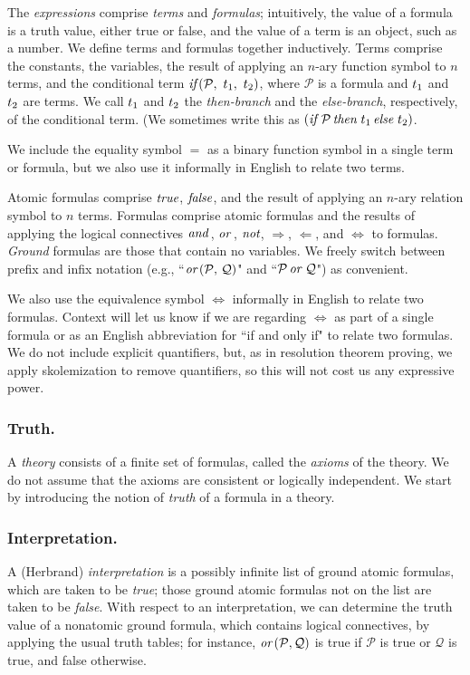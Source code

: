 \documentclass[runningheads]{llncs}
\DeclareMathOperator{\uand}{\emph{and}\,}
\DeclareMathOperator{\uor}{\emph{or}\,}
\DeclareMathOperator{\unot}{\emph{not}\kern-.0pt}
\DeclareMathOperator{\uimplies}{\Rightarrow}
\DeclareMathOperator{\uimpliedby}{\Leftarrow}
\DeclareMathOperator{\uiff}{\iff}
\DeclareMathOperator{\uif}{\emph{if}\,}
\DeclareMathOperator{\uthen}{\emph{then}\,}
\DeclareMathOperator{\uelse}{\emph{else}\,}
\begin{document}
   The \emph{expressions} comprise \emph{terms} and \emph{formulas}; intuitively, the value of a formula is a truth value, either true or false, and the value of a term is an object, such as a number.  We define terms and formulas together inductively.  Terms comprise the constants, the variables, the result of applying an $n$-ary function symbol to $n$ terms, and the conditional term  $\emph{if}\,( {\mathcal{P}},\allowbreak \ {{t}_{1}},\allowbreak \ {{t}_{2}})$, where $\mathcal{P}$ is a formula and  ${t}_{1}$ and ${t}_{2}$ are terms.   We call ${t}_{1}$ and ${t}_{2}$ the \emph{then-branch} and the \emph{else-branch}, respectively, of the conditional term. (We sometimes write this as 
   $(\uif \mathcal{P} \uthen t_1 \uelse t_2)$.
   
   We include the equality symbol $=$ as a binary function symbol in a single term or formula, but we also use it informally in English to relate two terms.
   
   Atomic formulas comprise $\emph{true}$, $\emph{false}$, and the result of applying an $n$-ary relation symbol to $n$ terms. Formulas comprise atomic formulas and the results of applying the logical connectives $\uand$,  $\uor$, $\unot$,  $\uimplies$, $\uimpliedby$, and  $\uiff$ to formulas. \emph{Ground} formulas are those that contain no variables. We freely switch between prefix and infix notation (e.g.,  ``$\uor(\mathcal{P},\, \mathcal{Q})$" and ``$\mathcal{P} \uor \mathcal{Q}$") as convenient.
   
   We also use the equivalence symbol $\uiff$ informally in English to relate two formulas. 
   Context will let us know if we are regarding $\uiff$ as part of a single formula or as an English abbreviation for “if and only if" to relate two formulas.
   We do not include explicit quantifiers, but, as in resolution theorem proving, we apply skolemization to remove quantifiers, so this will not cost us any expressive power. 
   
  
   
  \subsubsection{Truth.}  A \emph{theory} consists of a finite set of formulas, called the \emph{axioms} of the theory. We do not assume that the axioms are consistent or logically independent. We start by introducing the notion of \emph{truth} of a formula in a theory.
   
   \subsubsection{Interpretation.} A (Herbrand) \emph{interpretation} is a possibly infinite list of ground atomic formulas, which are taken to be \emph{true}; those ground atomic formulas not on the list are taken to be \emph{false}.  With respect to an interpretation, we can determine the truth value of a nonatomic ground formula, which contains logical connectives, by applying the usual truth tables; for instance, 
   $\uor (\mathcal{P}, \mathcal{Q})$ is true if $\mathcal{P}$ is true or $\mathcal{Q}$ is true, and false otherwise.  
   
\end{document}
